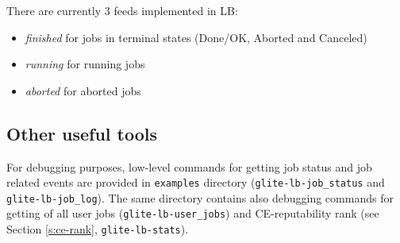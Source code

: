 There are currently 3 feeds implemented in LB:
\begin{itemize}
 \item \textit{finished} for jobs in terminal states (Done/OK, Aborted and Canceled)
 \item \textit{running} for running jobs
 \item \textit{aborted} for aborted jobs
\end{itemize}

\subsection{Other useful tools}

For debugging purposes, low-level commands for getting \LB job status and job related events are provided in 
\verb'examples' directory (\verb'glite-lb-job_status' and \verb'glite-lb-job_log'). The same directory
contains also debugging commands for getting of all user jobs (\verb'glite-lb-user_jobs') and
CE-reputability rank (see Section \ref{s:ce-rank}, \verb'glite-lb-stats').

